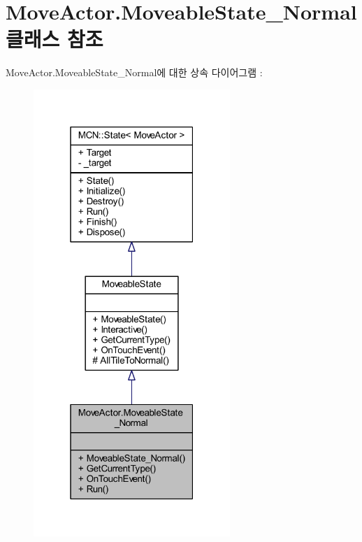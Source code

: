 \hypertarget{class_move_actor_1_1_moveable_state___normal}{}\section{Move\+Actor.\+Moveable\+State\+\_\+\+Normal 클래스 참조}
\label{class_move_actor_1_1_moveable_state___normal}


Move\+Actor.\+Moveable\+State\+\_\+\+Normal에 대한 상속 다이어그램 \+: \nopagebreak
\begin{figure}[H]
\begin{center}
\leavevmode
\includegraphics[width=211pt]{class_move_actor_1_1_moveable_state___normal__inherit__graph}
\end{center}
\end{figure}



